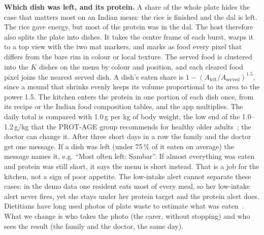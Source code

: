 \textbf{Which dish was left, and its protein.} A share of the whole plate
hides the case that matters most on an Indian menu: the rice is finished and the
dal is left. The rice gave energy, but most of the protein was in the dal. The
host therefore also splits the plate into dishes. It takes the centre frame of
each burst, warps it to a top view with the two mat markers, and marks as food
every pixel that differs from the bare rim in colour or local texture. The
served food is clustered into the $K$ dishes on the menu by colour and position,
and each cleared food pixel joins the nearest served dish. A dish's eaten share
is $1-(A_\text{left}/A_\text{served})^{1.5}$, since a mound that shrinks evenly
keeps its volume proportional to its area to the power 1.5. The kitchen enters
the protein in one portion of each dish once, from its recipe or the Indian food
composition tables, and the app multiplies. The daily total is compared with
1.0\,g per kg of body weight, the low end of the 1.0--1.2\,g/kg that the PROT-AGE
group recommends for healthy older adults~\cite{bauer2013protage}; the doctor can
change it. After three short days in a row the family and the doctor get one
message. If a dish was left (under 75\,\% of it eaten on average) the message
names it, e.g. ``Most often left: Sambar''. If almost everything was eaten and
protein was still short, it says the menu is short instead. That is a job for
the kitchen, not a sign of poor appetite. The low-intake alert cannot
separate these cases: in the demo data one resident eats most of every meal, so
her low-intake alert never fires, yet she stays under her protein target and
the protein alert does. Dietitians have long used photos of plate waste to
estimate what was eaten~\cite{williamson2003photo}. What we change is who takes
the photo (the carer, without stopping) and who sees the result (the family and
the doctor, the same day).
